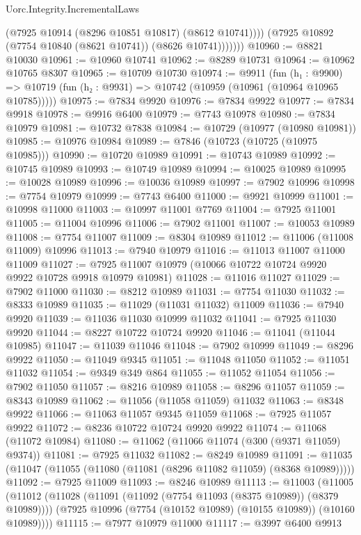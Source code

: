 \begin{lexlean}{Uorc.Integrity.IncrementalLaws}
\begin{coremodule}
                  (@7925 @10914 (@8296 @10851 @10817) (@8612 @10741))))
              (@7925 @10892 (@7754 @10840 (@8621 @10741)) (@8626 @10741)))))))
@10960 := @8821 @10030
@10961 := @10960 @10741
@10962 := @8289 @10731
@10964 := @10962 @10765 @8307
@10965 := @10709 @10730
@10974 := @9911
    (fun (h₁ : @9900) =>
    @10719 (fun (h₂ : @9931) => @10742 (@10959 (@10961 (@10964 @10965 @10785)))))
@10975 := @7834 @9920
@10976 := @7834 @9922
@10977 := @7834 @9918
@10978 := @9916 @6400
@10979 := @7743 @10978
@10980 := @7834 @10979
@10981 := @10732 @7838
@10984 := @10729 (@10977 (@10980 @10981))
@10985 := @10976 @10984
@10989 := @7846 (@10723 (@10725 (@10975 @10985)))
@10990 := @10720 @10989
@10991 := @10743 @10989
@10992 := @10745 @10989
@10993 := @10749 @10989
@10994 := @10025 @10989
@10995 := @10028 @10989
@10996 := @10036 @10989
@10997 := @7902 @10996
@10998 := @7754 @10979
@10999 := @7743 @6400
@11000 := @9921 @10999
@11001 := @10998 @11000
@11003 := @10997 @11001 @7769
@11004 := @7925 @11001
@11005 := @11004 @10996
@11006 := @7902 @11001
@11007 := @10053 @10989
@11008 := @7754 @11007
@11009 := @8304 @10989
@11012 := @11006 (@11008 @11009) @10996
@11013 := @7940 @10979
@11016 := @11013 @11007 @11000 @11009
@11027 := @7925 @11007 @10979 (@10066 @10722 @10724 @9920 @9922 @10728 @9918 @10979 @10981)
@11028 := @11016 @11027
@11029 := @7902 @11000
@11030 := @8212 @10989
@11031 := @7754 @11030
@11032 := @8333 @10989
@11035 := @11029 (@11031 @11032) @11009
@11036 := @7940 @9920
@11039 := @11036 @11030 @10999 @11032
@11041 := @7925 @11030 @9920
@11044 := @8227 @10722 @10724 @9920
@11046 := @11041 (@11044 @10985)
@11047 := @11039 @11046
@11048 := @7902 @10999
@11049 := @8296 @9922
@11050 := @11049 @9345
@11051 := @11048 @11050
@11052 := @11051 @11032
@11054 := @9349 @349 @864
@11055 := @11052 @11054
@11056 := @7902 @11050
@11057 := @8216 @10989
@11058 := @8296 @11057
@11059 := @8343 @10989
@11062 := @11056 (@11058 @11059) @11032
@11063 := @8348 @9922
@11066 := @11063 @11057 @9345 @11059
@11068 := @7925 @11057 @9922
@11072 := @8236 @10722 @10724 @9920 @9922
@11074 := @11068 (@11072 @10984)
@11080 := @11062 (@11066 @11074 (@300 (@9371 @11059) @9374))
@11081 := @7925 @11032
@11082 := @8249 @10989
@11091 := @11035 (@11047 (@11055 (@11080 (@11081 (@8296 @11082 @11059) (@8368 @10989)))))
@11092 := @7925 @11009
@11093 := @8246 @10989
@11113 := @11003
    (@11005
      (@11012
        (@11028 (@11091 (@11092 (@7754 @11093 (@8375 @10989)) (@8379 @10989))))
        (@7925 @10996 (@7754 (@10152 @10989) (@10155 @10989)) (@10160 @10989))))
@11115 := @7977 @10979 @11000
@11117 := @3997 @6400 @9913

\end{coremodule}
\end{lexlean}
